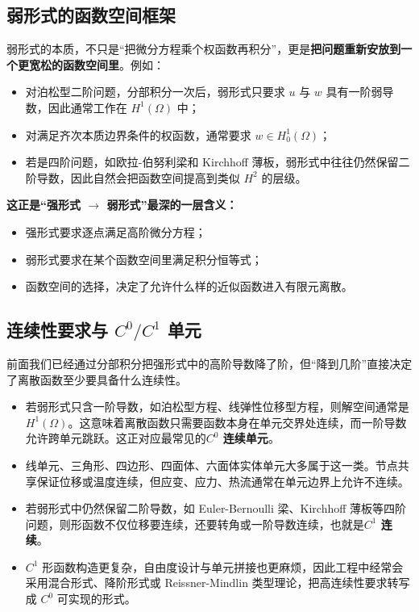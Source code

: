 \documentclass[11pt, a4paper, UTF8]{ctexart}
\begin{document}
\subsection{弱形式的函数空间框架}
弱形式的本质，不只是“把微分方程乘个权函数再积分”，更是\textbf{把问题重新安放到一个更宽松的函数空间里}。例如：
\begin{itemize}
    \item 对泊松型二阶问题，分部积分一次后，弱形式只要求 $u$ 与 $w$ 具有一阶弱导数，因此通常工作在 $H^1(\Omega)$ 中；
    \item 对满足齐次本质边界条件的权函数，通常要求 $w \in H^1_0(\Omega)$；
    \item 若是四阶问题，如欧拉-伯努利梁和 Kirchhoff 薄板，弱形式中往往仍然保留二阶导数，因此自然会把函数空间提高到类似 $H^2$ 的层级。
\end{itemize}

\textbf{这正是“强形式 $\rightarrow$ 弱形式”最深的一层含义：}
\begin{itemize}
    \item 强形式要求逐点满足高阶微分方程；
    \item 弱形式要求在某个函数空间里满足积分恒等式；
    \item 函数空间的选择，决定了允许什么样的近似函数进入有限元离散。
\end{itemize}

\subsection{连续性要求与 $C^0/C^1$ 单元}
前面我们已经通过分部积分把强形式中的高阶导数降了阶，但“降到几阶”直接决定了离散函数至少要具备什么连续性。
\begin{itemize}
    \item 若弱形式只含一阶导数，如泊松型方程、线弹性位移型方程，则解空间通常是 $H^1(\Omega)$。这意味着离散函数只需要函数本身在单元交界处连续，而一阶导数允许跨单元跳跃。这正对应最常见的\textbf{$C^0$ 连续单元}。
    \item 线单元、三角形、四边形、四面体、六面体实体单元大多属于这一类。节点共享保证位移或温度连续，但应变、应力、热流通常在单元边界上允许不连续。
    \item 若弱形式中仍然保留二阶导数，如 Euler-Bernoulli 梁、Kirchhoff 薄板等四阶问题，则形函数不仅位移要连续，还要转角或一阶导数连续，也就是\textbf{$C^1$ 连续}。
    \item $C^1$ 形函数构造更复杂，自由度设计与单元拼接也更麻烦，因此工程中经常会采用混合形式、降阶形式或 Reissner-Mindlin 类型理论，把高连续性要求转写成 $C^0$ 可实现的形式。
\end{itemize}
\end{document}
